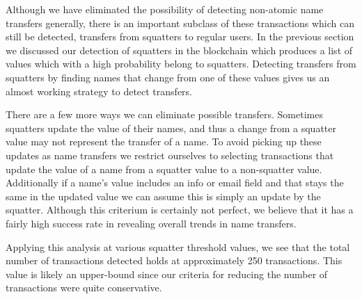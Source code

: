 Although we have eliminated the possibility of detecting non-atomic name transfers generally, there is an important subclass of these transactions which can still be detected, transfers from squatters to regular users. In the previous section we discussed our detection of squatters in the blockchain which produces a list of values which with a high probability belong to squatters. Detecting transfers from squatters by finding names that change from one of these values gives us an almost working strategy to detect transfers.

There are a few more ways we can eliminate possible transfers. Sometimes squatters update the value of their names, and thus a change from a squatter value may not represent the transfer of a name. To avoid picking up these updates as name transfers we restrict ourselves to selecting transactions that update the value of a name from a squatter value to a non-squatter value. Additionally if a name's value includes an info or email field and that stays the same in the updated value we can assume this is simply an update by the squatter. Although this criterium is certainly not perfect, we believe that it has a fairly high success rate in revealing overall trends in name transfers.

Applying this analysis at various squatter threshold values, we see that the total number of transactions detected holds at approximately 250 transactions. This value is likely an upper-bound since our criteria for reducing the number of transactions were quite conservative. 